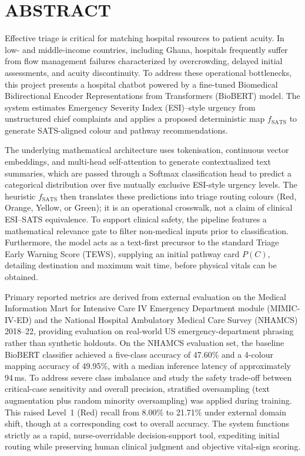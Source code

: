 \chapter*{ABSTRACT}

Effective triage is critical for matching hospital resources to patient acuity. In low- and middle-income countries, including Ghana, hospitals frequently suffer from flow management failures characterized by overcrowding, delayed initial assessments, and acuity discontinuity. To address these operational bottlenecks, this project presents a hospital chatbot powered by a fine-tuned Biomedical Bidirectional Encoder Representations from Transformers (BioBERT) model. The system estimates Emergency Severity Index (ESI)--style urgency from unstructured chief complaints and applies a proposed deterministic map \(f_{\mathrm{SATS}}\) to generate SATS-aligned colour and pathway recommendations.

The underlying mathematical architecture uses tokenisation, continuous vector embeddings, and multi-head self-attention to generate contextualized text summaries, which are passed through a Softmax classification head to predict a categorical distribution over five mutually exclusive ESI-style urgency levels. The heuristic \(f_{\mathrm{SATS}}\) then translates these predictions into triage routing colours (Red, Orange, Yellow, or Green); it is an operational crosswalk, not a claim of clinical ESI--SATS equivalence. To support clinical safety, the pipeline features a mathematical relevance gate to filter non-medical inputs prior to classification. Furthermore, the model acts as a text-first precursor to the standard Triage Early Warning Score (TEWS), supplying an initial pathway card \(P(C)\), detailing destination and maximum wait time, before physical vitals can be obtained.

Primary reported metrics are derived from external evaluation on the Medical Information Mart for Intensive Care IV Emergency Department module (MIMIC-IV-ED) and the National Hospital Ambulatory Medical Care Survey (NHAMCS) 2018--22, providing evaluation on real-world US emergency-department phrasing rather than synthetic holdouts. On the NHAMCS evaluation set, the baseline BioBERT classifier achieved a five-class accuracy of 47.60\% and a 4-colour mapping accuracy of 49.95\%, with a median inference latency of approximately 94\,ms. To address severe class imbalance and study the safety trade-off between critical-case sensitivity and overall precision, stratified oversampling (text augmentation plus random minority oversampling) was applied during training. This raised Level~1 (Red) recall from 8.00\% to 21.71\% under external domain shift, though at a corresponding cost to overall accuracy. The system functions strictly as a rapid, nurse-overridable decision-support tool, expediting initial routing while preserving human clinical judgment and objective vital-sign scoring.
